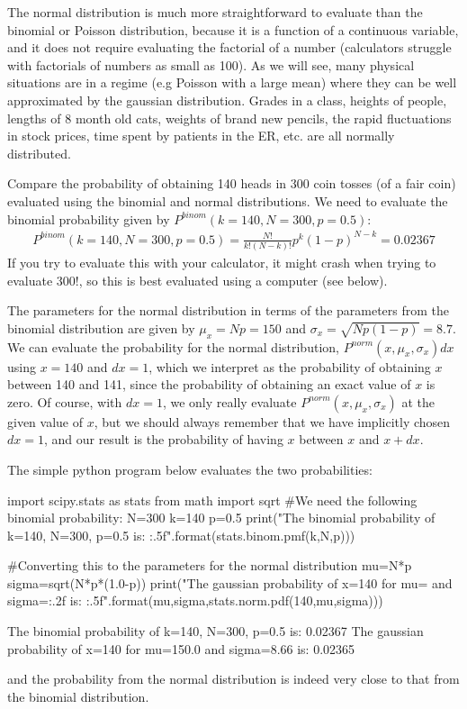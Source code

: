 The normal distribution is much more straightforward to evaluate than the binomial or Poisson distribution, because it is a function of a continuous variable, and it does not require evaluating the factorial of a number (calculators struggle with factorials of numbers as small as 100). As we will see, many physical situations are in a regime (e.g Poisson with a large mean) where they can be well approximated by the gaussian distribution. Grades in a class, heights of people, lengths of 8 month old cats, weights of brand new pencils, the rapid fluctuations in stock prices, time spent by patients in the ER, etc. are all normally distributed. 
\clearpage
\begin{example}{Compare the probability of obtaining 140 heads in 300 coin tosses (of a fair coin) evaluated using the binomial and normal distributions.}
We need to evaluate the binomial probability given by $P^{binom}(k=140,N=300,p=0.5)$:
\begin{align*}
P^{binom}(k=140,N=300,p=0.5)=\frac{N!}{k!(N-k)!}p^k(1-p)^{N-k}=0.02367
\end{align*}
If you try to evaluate this with your calculator, it might crash when trying to evaluate $300!$, so this is best evaluated using a computer (see below).

The parameters for the normal distribution in terms of the parameters from the binomial distribution are given by $\mu_x=Np=150$ and $\sigma_x=\sqrt{Np(1-p)}=8.7$. We can evaluate the probability for the normal distribution, $P^{norm}(x,\mu_x,\sigma_x)dx$ using $x=140$ and $dx=1$, which we interpret as the probability of obtaining $x$ between 140 and 141, since the probability of obtaining an exact value of $x$ is zero. Of course, with $dx=1$, we only really evaluate $P^{norm}(x,\mu_x,\sigma_x)$ at the given value of $x$, but we should always remember that we have implicitly chosen $dx=1$, and our result is the probability of having $x$ between $x$ and $x+dx$. 

The simple python program below evaluates the two probabilities:  
\begin{python}[caption = Comparison of probabilities from binomial and normal distributions]
import scipy.stats as stats
from math import sqrt
#We need the following binomial probability:
N=300
k=140
p=0.5
print("The binomial probability of k=140, N=300, p=0.5 is: {:.5f}".format(stats.binom.pmf(k,N,p)))

#Converting this to the parameters for the normal distribution
mu=N*p
sigma=sqrt(N*p*(1.0-p))
print("The gaussian probability of x=140 for mu={} and sigma={:.2f} is: {:.5f}".format(mu,sigma,stats.norm.pdf(140,mu,sigma)))
\end{python}
\begin{poutput}
The binomial probability of k=140, N=300, p=0.5 is: 0.02367
The gaussian probability of x=140 for mu=150.0 and sigma=8.66 is: 0.02365
\end{poutput}
and the probability from the normal distribution is indeed very close to that from the binomial distribution.
\end{example}

